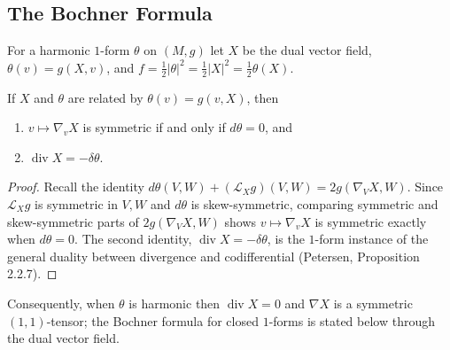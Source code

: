 \subsection{The Bochner Formula}

For a harmonic $1$-form $\theta$ on $(M,g)$ let $X$ be the dual vector field,
$\theta(v)=g(X,v)$, and $f=\tfrac12|\theta|^2=\tfrac12|X|^2=\tfrac12\theta(X)$.

\begin{proposition}[Proposition 9.2.1]
  \label{prop:pet-ch9-vector-field-1form-duality}
  If $X$ and $\theta$ are related by $\theta(v)=g(v,X)$, then
  \begin{enumerate}
    \item $v\mapsto\nabla_vX$ is symmetric if and only if $d\theta=0$, and
    \item $\operatorname{div}X=-\delta\theta$.
  \end{enumerate}
\end{proposition}
\begin{proof}
  Recall the identity $d\theta(V,W)+(\mathcal{L}_Xg)(V,W)=2g(\nabla_VX,W)$. Since
  $\mathcal{L}_Xg$ is symmetric in $V,W$ and $d\theta$ is skew-symmetric, comparing
  symmetric and skew-symmetric parts of $2g(\nabla_VX,W)$ shows $v\mapsto\nabla_vX$
  is symmetric exactly when $d\theta=0$. The second identity,
  $\operatorname{div}X=-\delta\theta$, is the $1$-form instance of the general duality
  between divergence and codifferential (Petersen, Proposition 2.2.7).
\end{proof}

Consequently, when $\theta$ is harmonic then $\operatorname{div}X=0$ and $\nabla X$ is a
symmetric $(1,1)$-tensor; the Bochner formula for closed $1$-forms is stated
below through the dual vector field.

